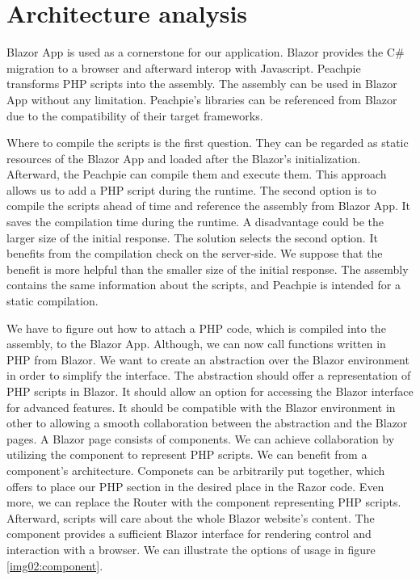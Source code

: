 \section{Architecture analysis}

Blazor App is used as a cornerstone for our application.
Blazor provides the C\# migration to a browser and afterward interop with Javascript.
Peachpie transforms PHP scripts into the assembly.
The assembly can be used in Blazor App without any limitation.
Peachpie's libraries can be referenced from Blazor due to the compatibility of their target frameworks.
\par
Where to compile the scripts is the first question.
They can be regarded as static resources of the Blazor App and loaded after the Blazor's initialization.
Afterward, the Peachpie can compile them and execute them.
This approach allows us to add a PHP script during the runtime.
The second option is to compile the scripts ahead of time and reference the assembly from Blazor App.
It saves the compilation time during the runtime.
A disadvantage could be the larger size of the initial response.
The solution selects the second option.
It benefits from the compilation check on the server-side.
We suppose that the benefit is more helpful than the smaller size of the initial response.
The assembly contains the same information about the scripts, and Peachpie is intended for a static compilation.
\par
We have to figure out how to attach a PHP code, which is compiled into the assembly, to the Blazor App.
Although, we can now call functions written in PHP from Blazor.
We want to create an abstraction over the Blazor environment in order to simplify the interface.
The abstraction should offer a representation of PHP scripts in Blazor.
It should allow an option for accessing the Blazor interface for advanced features.
It should be compatible with the Blazor environment in other to allowing a smooth collaboration between the abstraction and the Blazor pages.
A Blazor page consists of components.
We can achieve collaboration by utilizing the component to represent PHP scripts.
We can benefit from a component's architecture.
Componets can be arbitrarily put together, which offers to place our PHP section in the desired place in the Razor code.
Even more, we can replace the Router with the component representing PHP scripts.
Afterward, scripts will care about the whole Blazor website's content.
The component provides a sufficient Blazor interface for rendering control and interaction with a browser. 
We can illustrate the options of usage in figure \ref{img02:component}.
